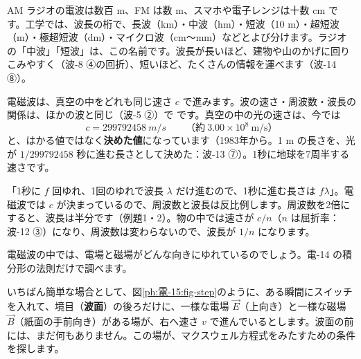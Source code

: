 \begin{phmijika}
AM ラジオの電波は数百 m、FM は数 m、スマホや電子レンジは十数 cm です。工学では、波長の桁で、長波（km）・中波（hm）・短波（10 m）・超短波（m）・極超短波（dm）・マイクロ波（cm〜mm）などとよび分けます。ラジオの「中波」「短波」は、この名前です。波長が長いほど、建物や山のかげに回りこみやすく（波-8 ④の回折）、短いほど、たくさんの情報を運べます（波-14 ⑧）。
\end{phmijika}



\leavevmode\label{ph:電-15:sec3}電磁波は、真空の中をどれも同じ速さ $c$ で進みます。波の速さ・周波数・波長の関係は、ほかの波と同じ（波-5 ②）で
\label{ph:電-15:clambda}です。真空の中の光の速さは、今では
\[ c=\qty{299792458}{m/s}\qquad（\text{約}\ 3.00\times10^8\ \mathrm{m/s}） \]
と、はかる値ではなく\textbf{決めた値}になっています（1983年から。1 m の長さを、光が $1/299792458$ 秒に進む長さとして決めた：波-13 ⑦）。1秒に地球を7周半する速さです。

\begin{phyomi}[$c=f\lambda$]
「1秒に $f$ 回ゆれ、1回のゆれで波長 $\lambda$ だけ進むので、1秒に進む長さは $f\lambda$」。電磁波では $c$ が決まっているので、周波数と波長は反比例します。周波数を2倍にすると、波長は半分です（例題1・2）。物の中では速さが $c/n$（$n$ は屈折率：波-12 ③）になり、周波数は変わらないので、波長が $1/n$ になります。
\end{phyomi}


\leavevmode\label{ph:電-15:sec4}電磁波の中では、電場と磁場がどんな向きにゆれているのでしょう。電-14 の積分形の法則だけで調べます。

いちばん簡単な場合として、図\ref{ph:電-15:fig-step}のように、ある瞬間にスイッチを入れて、境目（\textbf{波面}）の後ろだけに、一様な電場 $\vec E$（上向き）と一様な磁場 $\vec B$（紙面の手前向き）がある場が、右へ速さ $v$ で進んでいるとします。波面の前には、まだ何もありません。この場が、マクスウェル方程式をみたすための条件を探します。

